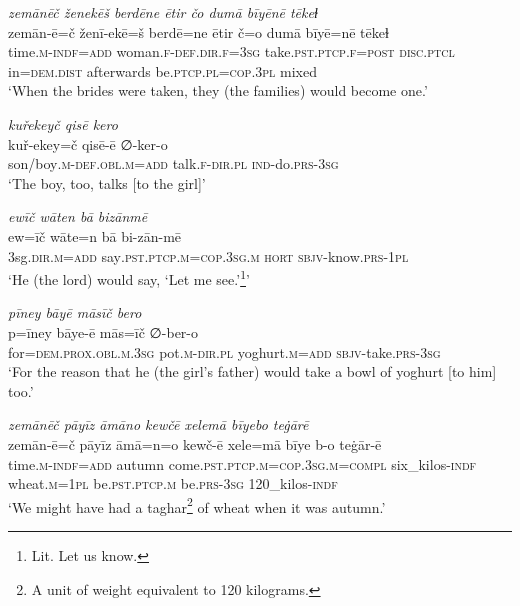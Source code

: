 \ea \label{RE.26}
\textit{zemānēč ženekēš berdēne ētir čo dumā bīyēnē tēkeɫ} \\ 
\gll zemān-ē=č ženī-ekē=š berdē=ne ētir č=o dumā bīyē=nē tēkeɫ \\ 
 time\textsc{.m}\textsc{-indf}\textsc{=add} woman\textsc{.f}\textsc{-def}\textsc{.dir}\textsc{.f}\textsc{=3sg} take\textsc{.pst}\textsc{.ptcp}\textsc{.f}\textsc{=\textsc{post}} \textsc{disc.ptcl} in=\textsc{dem.dist} afterwards be\textsc{.ptcp}\textsc{.pl}\textsc{=cop}\textsc{.3pl} mixed \\ 
\glt `When the brides were taken, they (the families) would become one.'
\z 
 
\ea \label{RE.32}
\textit{kuřekeyč qisē kero} \\ 
\gll kuř-ekey=č qisē-ē ∅-ker-o \\ 
 son/boy\textsc{.m}\textsc{-def}\textsc{.obl}\textsc{.m}\textsc{=add} talk\textsc{.f}\textsc{-dir}\textsc{.pl} \textsc{ind-}do\textsc{.prs}\textsc{-3sg} \\ 
\glt `The boy, too, talks [to the girl]'
\z 
 
\ea \label{RE.51}
\textit{ewīč wāten bā bizānmē} \\ 
\gll ew=īč wāte=n bā bi-zān-mē \\ 
 3sg\textsc{.dir}\textsc{.m}\textsc{=add} say\textsc{.pst}\textsc{.ptcp}\textsc{.m}\textsc{=cop}\textsc{.3sg}\textsc{.m} \textsc{hort} \textsc{sbjv-}know\textsc{.prs}\textsc{-\textsc{1pl}} \\ 
\glt `He (the lord) would say, ‘Let me see.’\footnote{Lit. Let us know.}'
\z 
 
\ea \label{RE.52}
\textit{pīney bāyē māsīč bero} \\ 
\gll p=īney bāye-ē mās=īč ∅-ber-o \\ 
 for=\textsc{dem.prox}\textsc{.obl}\textsc{.m}\textsc{.3sg} pot\textsc{.m}\textsc{-dir}\textsc{.pl} yoghurt\textsc{.m}\textsc{=add} \textsc{sbjv-}take\textsc{.prs}\textsc{-3sg} \\ 
\glt `For the reason that he (the girl’s father) would take a bowl of yoghurt [to him] too.'
\z 
 
\ea \label{RE.70}
\textit{zemānēč pāyīz āmāno kewčē xelemā bīyebo teġārē} \\ 
\gll zemān-ē=č pāyīz āmā=n=o kewč-ē xele=mā bīye b-o teġār-ē \\ 
 time\textsc{.m}\textsc{-indf}\textsc{=add} autumn come\textsc{.pst}\textsc{.ptcp}\textsc{.m}\textsc{=cop}\textsc{.3sg}\textsc{.m}\textsc{=compl} six\_kilos\textsc{-indf} wheat\textsc{.m}\textsc{=\textsc{1pl}} be\textsc{.pst}\textsc{.ptcp}\textsc{.m} be\textsc{.prs}\textsc{-3sg} 120\_kilos\textsc{-indf} \\ 
\glt `We might have had a taghar\footnote{A unit of weight equivalent to 120 kilograms.} of wheat when it was autumn.'
\z 
 
